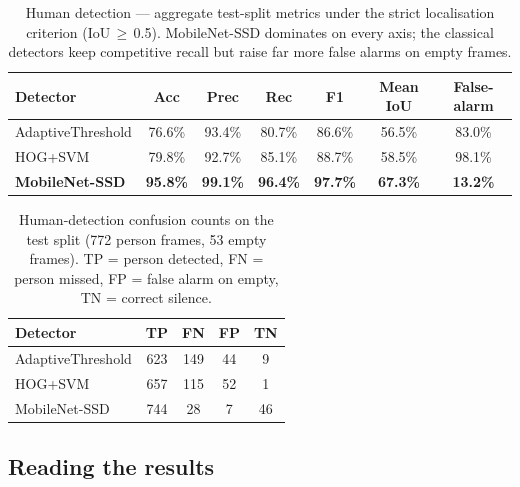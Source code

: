 \documentclass[11pt, a4paper]{article}
\begin{document}
\begin{table}[H]
\centering
\caption{Human detection --- aggregate test-split metrics under the strict
localisation criterion (IoU\,$\ge$\,0.5). MobileNet-SSD dominates on every axis;
the classical detectors keep competitive recall but raise far more false alarms
on empty frames.}
\renewcommand{\arraystretch}{1.3}
\begin{tabular}{lcccccc}
\toprule
\textbf{Detector} & \textbf{Acc} & \textbf{Prec} & \textbf{Rec} & \textbf{F1}
    & \textbf{Mean IoU} & \textbf{False-alarm} \\
\midrule
AdaptiveThreshold & 76.6\% & 93.4\% & 80.7\% & 86.6\% & 56.5\% & 83.0\% \\
HOG+SVM           & 79.8\% & 92.7\% & 85.1\% & 88.7\% & 58.5\% & 98.1\% \\
\textbf{MobileNet-SSD} & \textbf{95.8\%} & \textbf{99.1\%} & \textbf{96.4\%}
    & \textbf{97.7\%} & \textbf{67.3\%} & \textbf{13.2\%} \\
\bottomrule
\end{tabular}
\end{table}

\begin{table}[H]
\centering
\caption{Human-detection confusion counts on the test split (772 person frames,
53 empty frames). \textcolor{tpgreen}{TP} = person detected,
\textcolor{fnyellow}{FN} = person missed, \textcolor{fpred}{FP} = false alarm on
empty, \textcolor{tnblue}{TN} = correct silence.}
\renewcommand{\arraystretch}{1.3}
\begin{tabular}{lcccc}
\toprule
\textbf{Detector}
    & \textcolor{tpgreen}{\textbf{TP}} & \textcolor{fnyellow}{\textbf{FN}}
    & \textcolor{fpred}{\textbf{FP}}   & \textcolor{tnblue}{\textbf{TN}} \\
\midrule
AdaptiveThreshold & 623 & 149 & 44 &  9 \\
HOG+SVM           & 657 & 115 & 52 &  1 \\
MobileNet-SSD     & 744 &  28 &  7 & 46 \\
\bottomrule
\end{tabular}
\end{table}

\subsection{Reading the results}
\end{document}
